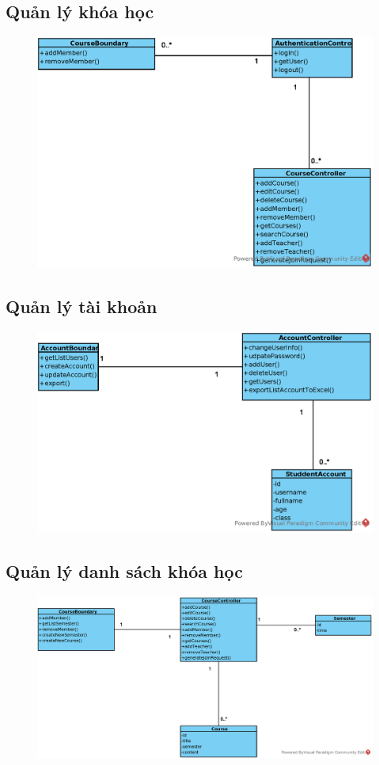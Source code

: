 \documentclass[./../main_file.tex]{subfiles}
\begin{document}
	\subsection{Quản lý khóa học}
	\begin{figure}[H]
		\centering
		\includegraphics[width=\linewidth]{./images/VOPCs/3_15_Create_live_session.eps}
	\end{figure}
	
	
	\subsection{Quản lý tài khoản }
	\begin{figure}[H]
		\centering
		\includegraphics[width=\linewidth]{./images/VOPCs/3_16_AccountManage.eps}
	\end{figure}
	
	
	\subsection{Quản lý danh sách khóa học}
	\begin{figure}[H]
		\centering
		\includegraphics[width=\linewidth]{./images/VOPCs/3_17_CourseManage.eps}
	\end{figure}
	
\end{document}
